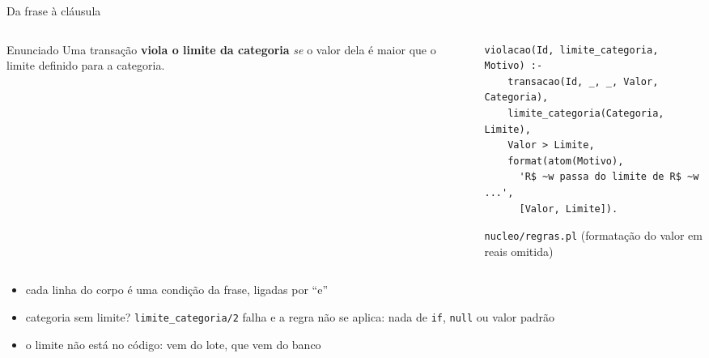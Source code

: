 \documentclass[aspectratio=169,11pt,xcolor=table]{beamer}
\begin{document}
\begin{frame}[fragile]{Da frase à cláusula}
  \begin{columns}[c]
    \begin{column}{0.36\textwidth}
      \begin{block}{Enunciado}
        \small Uma transação \textbf{viola o limite da categoria} \emph{se} o
        valor dela é maior que o limite definido para a categoria.
      \end{block}
    \end{column}
    \begin{column}{0.04\textwidth}
      \centering{\Large\color{accent}$\Rightarrow$}
    \end{column}
    \begin{column}{0.56\textwidth}
\begin{lstlisting}[style=pl]
violacao(Id, limite_categoria, Motivo) :-
    transacao(Id, _, _, Valor, Categoria),
    limite_categoria(Categoria, Limite),
    Valor > Limite,
    format(atom(Motivo),
      'R$ ~w passa do limite de R$ ~w ...',
      [Valor, Limite]).
\end{lstlisting}
      {\scriptsize\color{muted}\texttt{nucleo/regras.pl} (formatação do valor em reais omitida)}
    \end{column}
  \end{columns}
  \vspace{12pt}
  \begin{itemize}\small
    \item cada linha do corpo é uma condição da frase, ligadas por ``e''
    \item categoria sem limite? \texttt{limite\_categoria/2} falha e a regra não se
          aplica: nada de \texttt{if}, \texttt{null} ou valor padrão
    \item o limite não está no código: vem do lote, que vem do banco
  \end{itemize}
\end{frame}
\end{document}
